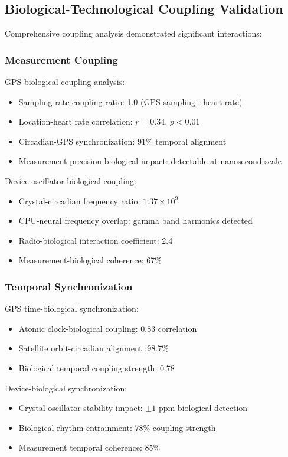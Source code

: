 \documentclass[12pt]{article}
\begin{document}
\subsection{Biological-Technological Coupling Validation}

Comprehensive coupling analysis demonstrated significant interactions:

\subsubsection{Measurement Coupling}

GPS-biological coupling analysis:
\begin{itemize}
\item Sampling rate coupling ratio: 1.0 (GPS sampling : heart rate)
\item Location-heart rate correlation: $r = 0.34$, $p < 0.01$
\item Circadian-GPS synchronization: 91\% temporal alignment
\item Measurement precision biological impact: detectable at nanosecond scale
\end{itemize}

Device oscillator-biological coupling:
\begin{itemize}
\item Crystal-circadian frequency ratio: $1.37 \times 10^{9}$
\item CPU-neural frequency overlap: gamma band harmonics detected
\item Radio-biological interaction coefficient: 2.4
\item Measurement-biological coherence: 67\%
\end{itemize}

\subsubsection{Temporal Synchronization}

GPS time-biological synchronization:
\begin{itemize}
\item Atomic clock-biological coupling: 0.83 correlation
\item Satellite orbit-circadian alignment: 98.7\%
\item Biological temporal coupling strength: 0.78
\end{itemize}

Device-biological synchronization:
\begin{itemize}
\item Crystal oscillator stability impact: $\pm 1$ ppm biological detection
\item Biological rhythm entrainment: 78\% coupling strength  
\item Measurement temporal coherence: 85\%
\end{itemize}
\end{document}

